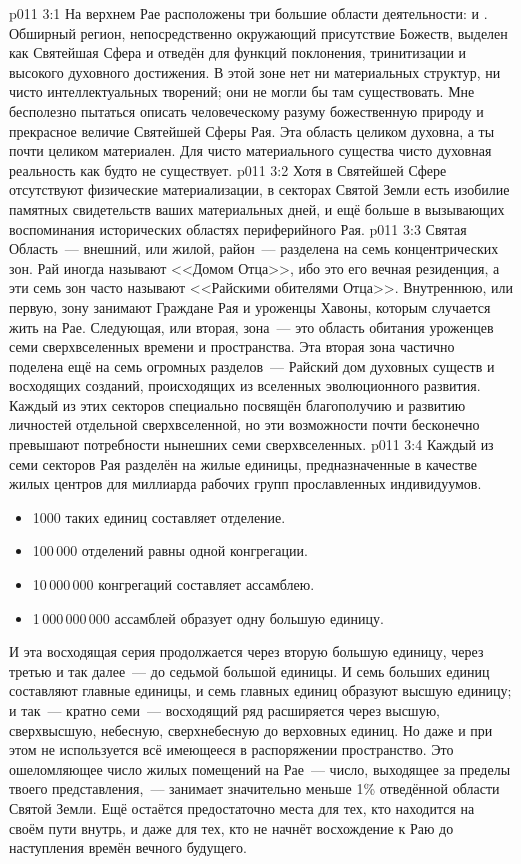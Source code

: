 \vs p011 3:1 На верхнем Рае расположены три большие области деятельности:   и . Обширный регион, непосредственно окружающий присутствие Божеств, выделен как Святейшая Сфера и отведён для функций поклонения, тринитизации и высокого духовного достижения. В этой зоне нет ни материальных структур, ни чисто интеллектуальных творений; они не могли бы там существовать. Мне бесполезно пытаться описать человеческому разуму божественную природу и прекрасное величие Святейшей Сферы Рая. Эта область целиком духовна, а ты почти целиком материален. Для чисто материального существа чисто духовная реальность как будто не существует.
\vs p011 3:2 Хотя в Святейшей Сфере отсутствуют физические материализации, в секторах Святой Земли есть изобилие памятных свидетельств ваших материальных дней, и ещё больше в вызывающих воспоминания исторических областях периферийного Рая.
\vs p011 3:3 Святая Область~--- внешний, или жилой, район~--- разделена на семь концентрических зон. Рай иногда называют <<Домом Отца>>, ибо это его вечная резиденция, а эти семь зон часто называют <<Райскими обителями Отца>>. Внутреннюю, или первую, зону занимают Граждане Рая и уроженцы Хавоны, которым случается жить на Рае. Следующая, или вторая, зона~--- это область обитания уроженцев семи сверхвселенных времени и пространства. Эта вторая зона частично поделена ещё на семь огромных разделов~--- Райский дом духовных существ и восходящих созданий, происходящих из вселенных эволюционного развития. Каждый из этих секторов специально посвящён благополучию и развитию личностей отдельной сверхвселенной, но эти возможности почти бесконечно превышают потребности нынешних семи сверхвселенных.
\vs p011 3:4 Каждый из семи секторов Рая разделён на жилые единицы, предназначенные в качестве жилых центров для миллиарда рабочих групп прославленных индивидуумов. \begin{itemize}\item 1000 таких единиц составляет отделение. \item 100\,000 отделений равны одной конгрегации. \item 10\,000\,000 конгрегаций составляет ассамблею. \item 1\,000\,000\,000 ассамблей образует одну большую единицу.\end{itemize} И эта восходящая серия продолжается через вторую большую единицу, через третью и так далее~--- до седьмой большой единицы. И семь больших единиц составляют главные единицы, и семь главных единиц образуют высшую единицу; и так~--- кратно семи~--- восходящий ряд расширяется через высшую, сверхвысшую, небесную, сверхнебесную до верховных единиц. Но даже и при этом не используется всё имеющееся в распоряжении пространство. Это ошеломляющее число жилых помещений на Рае~--- число, выходящее за пределы твоего представления,~--- занимает значительно меньше 1\% отведённой области Святой Земли. Ещё остаётся предостаточно места для тех, кто находится на своём пути внутрь, и даже для тех, кто не начнёт восхождение к Раю до наступления времён вечного будущего.
